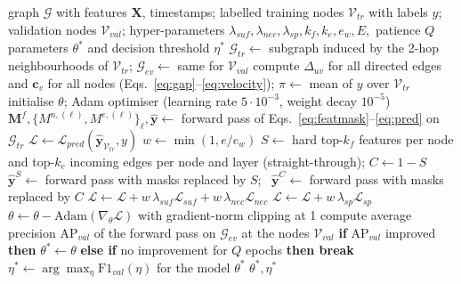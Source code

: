 \begin{algorithm}[!t]
\caption{RTXGNN training (as implemented in \texttt{rtxgnn/train.py} and \texttt{rtxgnn/objective.py}).}
\label{alg:training}
\begin{algorithmic}[1]
\REQUIRE graph $\mathcal{G}$ with features $\mathbf{X}$, timestamps; labelled training nodes $\mathcal{V}_{tr}$ with labels $y$; validation nodes $\mathcal{V}_{val}$; hyper-parameters $\lambda_{suf},\lambda_{nec},\lambda_{sp},k_f,k_e,e_w,E,$ patience $Q$
\ENSURE parameters $\theta^\ast$ and decision threshold $\eta^\ast$
\STATE $\mathcal{G}_{tr}\gets$ subgraph induced by the 2-hop neighbourhoods of $\mathcal{V}_{tr}$; $\mathcal{G}_{ev}\gets$ same for $\mathcal{V}_{val}$
\STATE compute $\Delta_{uv}$ for all directed edges and $\mathbf{c}_v$ for all nodes (Eqs.~\ref{eq:gap}--\ref{eq:velocity}); $\pi\gets$ mean of $y$ over $\mathcal{V}_{tr}$
\STATE initialise $\theta$; Adam optimiser (learning rate $5\cdot10^{-3}$, weight decay $10^{-5}$)
  \STATE $\mathbf{M}^f,\{M^{n,(\ell)},M^{e,(\ell)}\}_{\ell},\hat{\mathbf{y}}\gets$ forward pass of Eqs.~\ref{eq:featmask}--\ref{eq:pred} on $\mathcal{G}_{tr}$
  \STATE $\mathcal{L}\gets\mathcal{L}_{pred}(\hat{\mathbf{y}}_{\mathcal{V}_{tr}},y)$ 
  \STATE $w\gets\min(1,e/e_w)$
     \STATE $S\gets$ hard top-$k_f$ features per node and top-$k_e$ incoming edges per node and layer (straight-through); $C\gets 1-S$
     \STATE $\hat{\mathbf{y}}^S\gets$ forward pass with masks replaced by $S$; \ $\hat{\mathbf{y}}^C\gets$ forward pass with masks replaced by $C$
     \STATE $\mathcal{L}\gets\mathcal{L}+w\,\lambda_{suf}\mathcal{L}_{suf}+w\,\lambda_{nec}\mathcal{L}_{nec}$ 
  \ENDIF
  \STATE $\mathcal{L}\gets\mathcal{L}+w\,\lambda_{sp}\mathcal{L}_{sp}$ 
  \STATE $\theta\gets\theta-\mathrm{Adam}(\nabla_\theta\mathcal{L})$ with gradient-norm clipping at 1
     \STATE compute average precision $\mathrm{AP}_{val}$ of the forward pass on $\mathcal{G}_{ev}$ at the nodes $\mathcal{V}_{val}$
     \STATE \textbf{if} $\mathrm{AP}_{val}$ improved \textbf{then} $\theta^\ast\gets\theta$ \textbf{else if} no improvement for $Q$ epochs \textbf{then break}
  \ENDIF
\ENDFOR
\STATE $\eta^\ast\gets\arg\max_\eta \mathrm{F1}_{val}(\eta)$ for the model $\theta^\ast$
\RETURN $\theta^\ast,\eta^\ast$
\end{algorithmic}
\end{algorithm}

